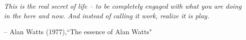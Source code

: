 \documentclass[\main/thesis.tex]{subfiles}
\begin{document}
\begin{quotepage}
 \vspace*{1in}
 \begin{center}
	\emph{This is the real secret of life -- to be completely engaged
	with what you are doing in the here and now. And instead of calling
	it work, realize it is play.}
	\begin{flushright}
		-- Alan Watts (1977),``The essence of Alan Watts"
	\end{flushright}
 \end{center}
\end{quotepage}
\end{document}
